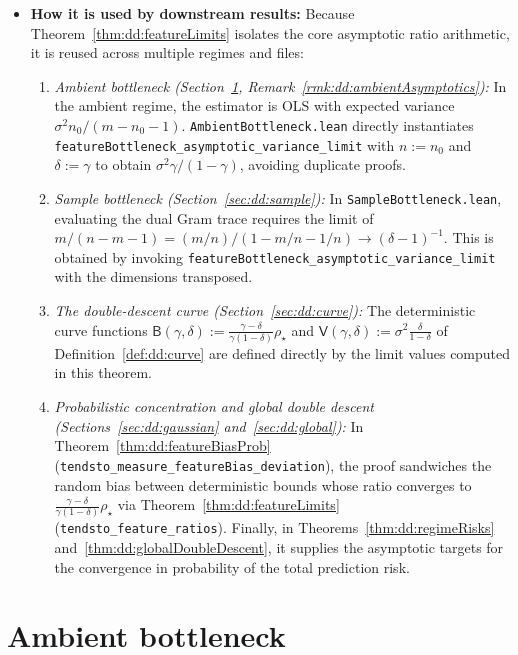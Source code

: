 \begin{remark}
\begin{itemize}
  \item \textbf{How it is used by downstream results:}
  Because Theorem~\ref{thm:dd:featureLimits} isolates the core asymptotic ratio arithmetic, it is reused across multiple regimes and files:
  \begin{enumerate}
    \item \emph{Ambient bottleneck (Section~\ref{sec:dd:ambient}, Remark~\ref{rmk:dd:ambientAsymptotics}):}
    In the ambient regime, the estimator is OLS with expected variance $\sigma^2n_0/(m-n_0-1)$. \texttt{AmbientBottleneck.lean} directly instantiates \texttt{featureBottleneck\_asymptotic\_variance\_limit} with $n:=n_0$ and $\delta:=\gamma$ to obtain $\sigma^2\gamma/(1-\gamma)$, avoiding duplicate proofs.
    \item \emph{Sample bottleneck (Section~\ref{sec:dd:sample}):}
    In \texttt{SampleBottleneck.lean}, evaluating the dual Gram trace requires the limit of $m/(n-m-1) = (m/n)\big/(1 - m/n - 1/n) \to (\delta-1)^{-1}$. This is obtained by invoking \texttt{featureBottleneck\_asymptotic\_variance\_limit} with the dimensions transposed.
    \item \emph{The double-descent curve (Section~\ref{sec:dd:curve}):}
    The deterministic curve functions $\mathsf B(\gamma,\delta) := \frac{\gamma-\delta}{\gamma(1-\delta)}\rho_\star$ and $\mathsf V(\gamma,\delta) := \sigma^2\frac{\delta}{1-\delta}$ of Definition~\ref{def:dd:curve} are defined directly by the limit values computed in this theorem.
    \item \emph{Probabilistic concentration and global double descent (Sections~\ref{sec:dd:gaussian} and~\ref{sec:dd:global}):}
    In Theorem~\ref{thm:dd:featureBiasProb} (\texttt{tendsto\_measure\_featureBias\_deviation}), the proof sandwiches the random bias between deterministic bounds whose ratio converges to $\frac{\gamma-\delta}{\gamma(1-\delta)}\rho_\star$ via Theorem~\ref{thm:dd:featureLimits} (\texttt{tendsto\_feature\_ratios}). Finally, in Theorems~\ref{thm:dd:regimeRisks} and~\ref{thm:dd:globalDoubleDescent}, it supplies the asymptotic targets for the convergence in probability of the total prediction risk.
  \end{enumerate}
\end{itemize}
\end{remark}


\section{Ambient bottleneck}\label{sec:dd:ambient}

